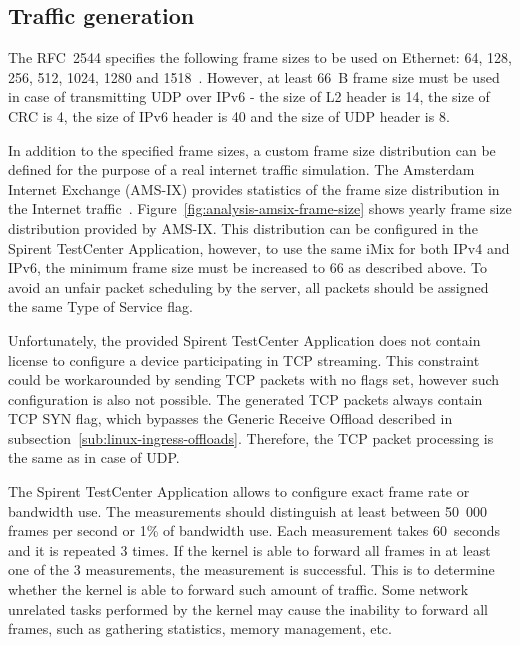 
\subsection{Traffic generation}\label{sub:analysis-metodology-generation}
The RFC~2544 specifies the following frame sizes to be used on Ethernet:
64, 128, 256, 512, 1024, 1280 and 1518~\cite{rfc2544}.
However, at least 66~B frame size must be used in case of transmitting UDP over IPv6 - the size of L2 header is 14,
the size of CRC is 4, the size of IPv6 header is 40 and the size of UDP header is 8.

In addition to the specified frame sizes, a custom frame size distribution can be defined for the purpose of
a real internet traffic simulation.
The Amsterdam Internet Exchange (AMS-IX) provides
statistics of the frame size distribution in the Internet traffic~\cite{amsix-frame-size}.
Figure~\ref{fig:analysis-amsix-frame-size} shows yearly frame size distribution provided by AMS-IX.
This distribution can be configured in the Spirent TestCenter Application, however,
to use the same iMix for both IPv4 and IPv6, the minimum frame size must be increased to 66 as described above.
To avoid an unfair packet scheduling by the server, all packets should be assigned the same Type of Service flag.

Unfortunately,
the provided Spirent TestCenter Application does not contain license to configure a device participating in TCP streaming.
This constraint could be workarounded by sending TCP packets with no flags set,
however such configuration is also not possible.
The generated TCP packets always contain TCP SYN flag,
which bypasses the Generic Receive Offload described in subsection~\ref{sub:linux-ingress-offloads}.
Therefore, the TCP packet processing is the same as in case of UDP.

The Spirent TestCenter Application allows to configure exact frame rate or bandwidth use.
The measurements should distinguish at least between 50~000 frames per second or 1\% of bandwidth use.
Each measurement takes 60~seconds and it is repeated 3 times.
If the kernel is able to forward all frames in at least one of the 3 measurements,
the measurement is successful.
This is to determine whether the kernel is able to forward such amount of traffic.
Some network unrelated tasks performed by the kernel may cause the inability to forward all frames,
such as gathering statistics, memory management, etc.

